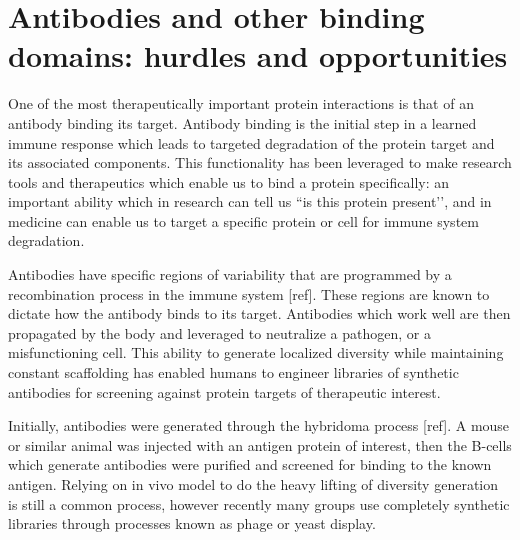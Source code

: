 \section{Antibodies and other binding domains: hurdles and opportunities}

One of the most therapeutically important protein interactions is that of an antibody binding its target. Antibody binding is the initial step in a learned immune response which leads to targeted degradation of the protein target and its associated components. This functionality has been leveraged to make research tools and therapeutics  which enable us to bind a protein specifically: an important ability which in research can tell us ``is this protein present’’, and in medicine can enable us to target a specific protein or cell for immune system degradation.

Antibodies have specific regions of variability that are programmed by a recombination process in the immune system [ref]. These regions are known to dictate how the antibody binds to its target. Antibodies which work well are then propagated by the body and leveraged to neutralize a pathogen, or a misfunctioning cell. This ability to generate localized diversity while maintaining constant scaffolding has enabled humans to engineer libraries of synthetic antibodies for screening against protein targets of therapeutic interest.

Initially, antibodies were generated through the hybridoma process [ref]. A mouse or similar animal was injected with an antigen protein of interest, then the B-cells which generate antibodies were purified and screened for binding to the known antigen. Relying on in vivo model to do the heavy lifting of diversity generation is still a common process, however recently many groups use completely synthetic libraries through processes known as phage or yeast display.

